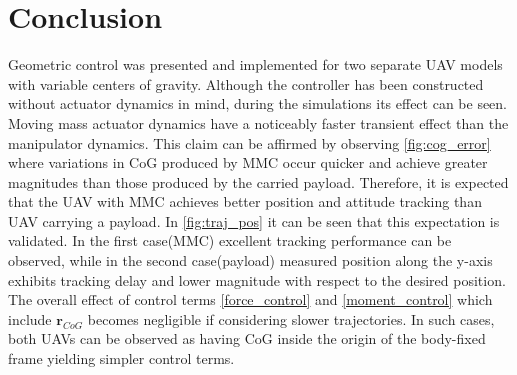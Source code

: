 \section{Conclusion} \label{sec:conclusion}
Geometric control was presented and implemented for two separate UAV models with variable centers of gravity. Although the controller has been constructed without actuator dynamics in mind, during the simulations its effect can be seen. \\
Moving mass actuator dynamics have a noticeably faster transient effect than the manipulator dynamics. This claim can be affirmed by observing \ref{fig:cog_error} where variations in CoG produced by MMC occur quicker and achieve greater magnitudes than those produced by the carried payload. Therefore, it is expected that the UAV with MMC achieves better position and attitude tracking than UAV carrying a payload. In \ref{fig:traj_pos} it can be seen that this expectation is validated. In the first case(MMC) excellent tracking performance can be observed, while in the second case(payload) measured position along the y-axis exhibits tracking delay and lower magnitude with respect to the desired position. \\
The overall effect of control terms \ref{force_control} and \ref{moment_control} which include $\textbf{r}_{CoG}$ becomes negligible if considering slower trajectories. In such cases, both UAVs can be observed as having CoG inside the origin of the body-fixed frame yielding simpler control terms.
